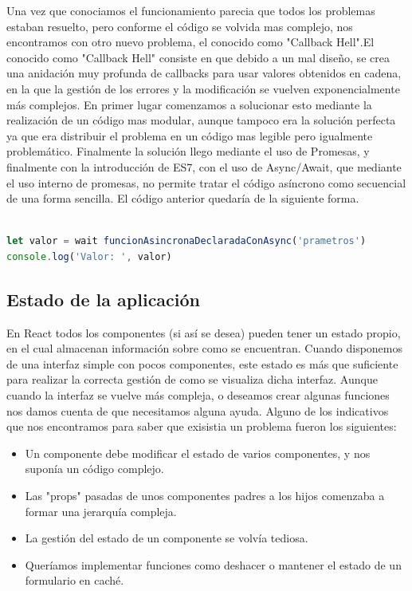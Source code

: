 Una vez que conociamos el funcionamiento parecia que todos los problemas estaban resuelto, pero conforme el código se volvida mas complejo, nos encontramos con otro nuevo problema, el conocido como "Callback Hell".El conocido como "Callback Hell" consiste en que debido a un mal diseño, se crea una anidación muy profunda de callbacks para usar valores obtenidos en cadena, en la que la gestión de los errores y la modificación se vuelven exponencialmente más complejos. En primer lugar comenzamos a solucionar esto mediante la realización de un código mas modular, aunque tampoco era la solución perfecta ya que era distribuir el problema en un código mas legible pero igualmente problemático. Finalmente la solución llego mediante el uso de Promesas, y finalmente con la introducción de ES7, con el uso de Async/Await, que mediante el uso interno de promesas, no permite tratar el código asíncrono como secuencial de una forma sencilla. El código anterior quedaría de la siguiente forma.

\begin{lstlisting}[language=javascript,caption={Ejemplo Async/Await},label={lst:appjs}]

let valor = wait funcionAsincronaDeclaradaConAsync('prametros')
console.log('Valor: ', valor)

\end{lstlisting}

\subsection {Estado de la aplicación}
En React todos los componentes (si así se desea) pueden tener un estado propio, en el cual almacenan información sobre como se encuentran. Cuando disponemos de una interfaz simple con pocos componentes, este estado es más que suficiente para realizar la correcta gestión de como se visualiza dicha interfaz. Aunque cuando la interfaz se vuelve más compleja, o deseamos crear algunas funciones nos damos cuenta de que necesitamos alguna ayuda. Alguno de los indicativos que nos encontramos para saber que exisistia un problema fueron los siguientes:
\begin{itemize}
  \item Un componente debe modificar el estado de varios componentes, y nos suponía un código complejo.
  \item Las "props" pasadas de unos componentes padres a los hijos comenzaba a formar una jerarquía compleja.
  \item La gestión del estado de un componente se volvía tediosa.
  \item Queríamos implementar funciones como deshacer o mantener el estado de un formulario en caché.
\end{itemize}

